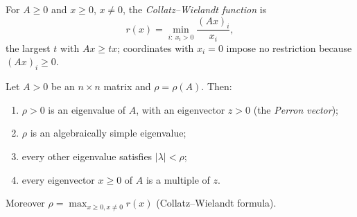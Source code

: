 For $A\ge0$ and $x\ge0$, $x\ne0$, the \emph{Collatz--Wielandt function} is
\[
r(x)=\min_{i:\ x_i>0}\frac{(Ax)_i}{x_i},
\]
the largest $t$ with $Ax\ge tx$; coordinates with $x_i=0$ impose no
restriction because $(Ax)_i\ge0$.

\begin{theorem}[Perron, 1907]\label{linear:thm:perron}
Let $A>0$ be an $n\times n$ matrix and $\rho=\rho(A)$. Then:
\begin{enumerate}[label=(\alph*)]
\item $\rho>0$ is an eigenvalue of $A$, with an eigenvector $z>0$ (the \emph{Perron vector});
\item $\rho$ is an algebraically simple eigenvalue;
\item every other eigenvalue satisfies $|\lambda|<\rho$;
\item every eigenvector $x\ge0$ of $A$ is a multiple of $z$.
\end{enumerate}
Moreover $\rho=\max_{x\ge0,x\ne0}r(x)$ (Collatz--Wielandt formula).
\end{theorem}

